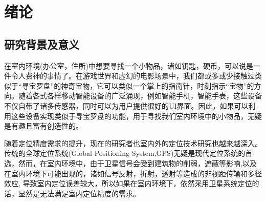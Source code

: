 \documentclass[winfonts,oneside]{njuthesis}
\begin{document}
%
%
%
%

\tableofcontents



\mainmatter

\chapter{绪论}\label{chapter_introduction}
	\section{研究背景及意义}
	
		在室内环境(办公室，住所)中想要寻找一个小物品，诸如钥匙，硬币，可以说是一件令人费神的事情了\cite{HyperEarAbstract}。在游戏世界和虚幻的电影场景中，我们都或多或少接触过类似于“寻宝罗盘”的神奇宝物，它可以类似一个掌上的指南针，时刻指示“宝物”的方向。随着各式各样移动智能设备的广泛涌现，例如智能手机，智能手表，这些设备不仅自带了诸多传感器，同时可以为用户提供很好的UI界面。因此，如果可以利用这些设备实现类似于寻宝罗盘的功能，用于寻找我们室内环境中的小物品，无疑是有趣且富有创造性的。
		
		随着定位精度需求的提升，现在的研究者也室内外的定位技术研究也越来越深入。传统的全球定位系统(Global Positioning System,GPS)\cite{wikipedia_GPS}无疑是现代定位系统的首选，然而，在室内环境中，由于卫星信号会受到建筑物的削弱，遮蔽等影响,以及在室内环境下可能出现的，诸如信号反射，折射，透射等造成的非视距传输和多径效应, 导致室内定位误差较大，所以如果在室内环境下，依然采用卫星系统定位的话，显然是无法满足室内定位精度的需求。
		
\end{document}
